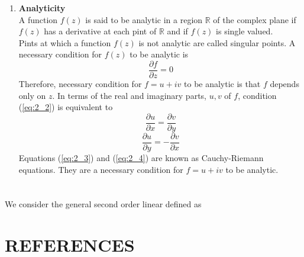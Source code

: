 \documentclass[12pt]{report}
\newcommand{\refn}[1]{(\ref{#1})}
\newcommand{\refx}[1]{\refn{eq:#1}}
\newcommand{\bt}[1]{\textbf{#1}}
\newcommand{\real}{ \mathbb{R}}
\begin{document}
\begin{enumerate}
		\item\bt{Analyticity}\\
		A function $f(z)$ is said to be analytic in a region $\real$ of the complex plane if $f(z)$ has a derivative at each pint of  $\real$ and if $f(z)$ is single valued.\\
		Pints at which a function $f(z)$ is not analytic are called singular points. A necessary condition for $f(z)$ to be analytic is
		\begin{equation}
			\frac{\partial f}{\partial z}=0
			\label{eq:2_2}
		\end{equation}
		Therefore, necessary condition for $f=u+iv$ to be analytic is that $f$ depends only on $z$. In terms of the real and imaginary parts, $u,v$ of $f$, condition \refx{2_2} is equivalent to
		\begin{equation}
			\frac{\partial u}{\partial x}=\frac{\partial v}{\partial y}
			\label{eq:2_3}
		\end{equation}
		\begin{equation}
			\frac{\partial u}{\partial y}=-\frac{\partial 	v}{\partial x}
			\label{eq:2_4}
		\end{equation}
		Equations \refx{2_3} and \refx{2_4} are known as Cauchy-Riemann equations. They are a necessary condition for $f=u+iv$ to be analytic.
	\end{enumerate}
	\newpage
	
	\chapter{}
	

	
	
	\chapter{}
	We consider the general second order linear defined as 
	
	

	
	\chapter{}
	
	

	\newpage
	
	\chapter*{REFERENCES}
	
\end{document}
